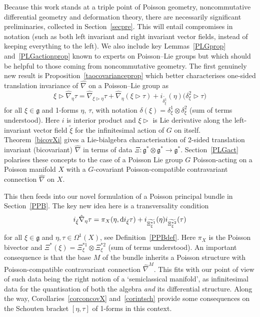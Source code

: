 \documentclass[10pt,a4paper]{amsart}
\numberwithin{equation}{section}
\newcommand{\<}{{\langle}}
\renewcommand{\>}{{\rangle}}
\newcommand{\tens}{\otimes}
\newcommand{\extd}{{\rm d}}
\newcommand{\la}{{\triangleright}}
\newcommand{\cg}{{\mathfrak{g}}}
\begin{document}
Because this work stands at a triple point of Poisson geometry, noncommutative differential geometry and deformation theory, there are necessarily significant preliminaries, collected in Section~\ref{secpre}. This will entail compromises in notation (such as both left invariant and right invariant vector fields, instead of keeping everything to the left). We also include key Lemmas~\ref{PLGprop} and~\ref{PLGactionprop} known to experts on Poisson--Lie groups but which should be helpful to those coming from noncommutative geometry. The first genuinely new result is Proposition~\ref{taocovarianceprop} which better characterises one-sided translation invariance of $\hat\nabla$ on a Poisson--Lie group as
\[ \xi\la\hat\nabla_{\eta}\tau=\hat\nabla_{\xi\la\eta}\tau+\hat\nabla_{\eta}(\xi\la\tau) +i_{\tilde{\delta_\xi^1}}(\eta)\big(\delta_\xi^2\la\tau\big)\]
for all $\xi\in\cg$ and 1-forms $\eta$, $\tau$, with notation $\delta(\xi)=\delta^1_\xi\tens\delta^2_\xi$ (sum of terms understood). Here $i$ is interior product and $\xi\la$ is Lie derivative along the left-invariant vector field $\tilde\xi$ for the infinitesimal action of $G$ on itself. Theorem~\ref{bicovXi} gives a Lie-bialgebra characterisation of 2-sided translation invariant (bicovariant) $\hat\nabla$ in terms of data $\Xi\colon \cg^*\tens\cg^*\to \cg^*$. Section~\ref{PLGact} polarises these concepts to the case of a Poisson Lie group $G$ Poisson-acting on a Poisson manifold $X$ with a $G$-covariant Poisson-compatible contravariant connection $\hat\nabla$ on $X$.

This then feeds into our novel formulation of a Poisson principal bundle in Section~\ref{PPB}. The key new idea here is a transversality condition
\[ i_{\tilde\xi}\hat\nabla_\eta\tau=\pi_X(\eta,\extd i_{\tilde\xi}\tau)+i_{\widetilde{\Xi_\xi^{*1}}}(\eta) i_{\widetilde{\Xi_\xi^{*2}}}(\tau)\]
for all $\xi\in \cg$ and $\eta,\tau \in \Omega^1(X)$, see Definition~\ref{PPBdef}. Here $\pi_X$ is the Poisson bivector and $\Xi^*(\xi)=\Xi_\xi^{*1}\tens \Xi_\xi^{*2}$ (sum of terms understood). An important consequence is that the base $M$ of the bundle inherits a Poisson structure with Poisson-compatible contravariant connection $\hat\nabla^M$. This fits with our point of view of such data being the right notion of a `semiclassical manifold', as infinitesimal data for the quantisation of both the algebra {\em and} its differential structure. Along the way, Corollaries~\ref{corconcovX} and~\ref{corintsch} provide some consequences on the Schouten bracket $[\eta,\tau]$ of 1-forms in this context.
\end{document}
